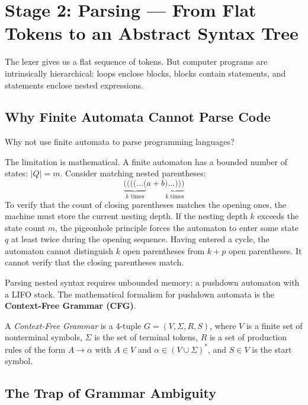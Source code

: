 \section{Stage 2: Parsing --- From Flat Tokens to an Abstract Syntax Tree}
\label{ch41:parsing}

The lexer gives us a flat sequence of tokens. But computer programs are
intrinsically hierarchical: loops enclose blocks, blocks contain statements,
and statements enclose nested expressions.

\subsection{Why Finite Automata Cannot Parse Code}

Why not use finite automata to parse programming languages?

The limitation is mathematical. A finite automaton has a bounded number of
states: $|Q| = m$. Consider matching nested parentheses:
\[
  \underbrace{\texttt{((((}\dots\texttt{(}}_{k \text{ times}} a + b \underbrace{\texttt{)}\dots\texttt{)))}}
  _{k \text{ times}}
\]
To verify that the count of closing parentheses matches the opening ones, the
machine must store the current nesting depth. If the nesting depth $k$ exceeds
the state count $m$, the pigeonhole principle forces the automaton to enter some
state $q$ at least twice during the opening sequence. Having entered a cycle, the
automaton cannot distinguish $k$ open parentheses from $k + p$ open parentheses.
It cannot verify that the closing parentheses match.

Parsing nested syntax requires unbounded memory: a pushdown automaton with a
LIFO stack. The mathematical formalism for pushdown automata is the
\textbf{Context-Free Grammar (CFG)}.

\begin{definition}
\label{ch41:def-cfg}
A \emph{Context-Free Grammar} is a 4-tuple $G = (V, \Sigma, R, S)$, where $V$ is a
finite set of nonterminal symbols, $\Sigma$ is the set of terminal tokens, $R$ is
a set of production rules of the form $A \to \alpha$ with $A \in V$ and
$\alpha \in (V \cup \Sigma)^*$, and $S \in V$ is the start symbol.
\end{definition}

\subsection{The Trap of Grammar Ambiguity}

